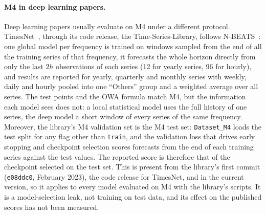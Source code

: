 \paragraph{M4 in deep learning papers.}
Deep learning papers usually evaluate on M4 under a different protocol.
TimesNet~\citep{wu2023timesnet}, through its code release, the
Time-Series-Library, follows N-BEATS~\citep{oreshkin2020nbeats}: one global
model per frequency is trained on windows sampled from the end of all the
training series of that frequency, it forecasts the whole horizon directly
from only the last $2h$ observations of each series (12 for yearly series, 96
for hourly), and results are reported for yearly, quarterly and monthly series
with weekly, daily and hourly pooled into one ``Others'' group and a weighted
average over all series. The test points and the OWA formula match M4, but the
information each model sees does not: a local statistical model uses the full
history of one series, the deep model a short window of every series of the
same frequency. Moreover, the library's M4 validation set is the M4 test set:
\texttt{Dataset\_M4} loads the test split for any flag other than
\texttt{train}, and the validation loss that drives early stopping and
checkpoint selection scores forecasts from the end of each training series
against the test values. The reported score is therefore that of the
checkpoint selected on the test set. This is present from the library's first
commit (\texttt{e08ddc0}, February 2023), the code release for TimesNet, and
in the current version, so it applies to every model evaluated on M4 with the
library's scripts. It is a model-selection leak, not training on test data,
and its effect on the published scores has not been measured.


